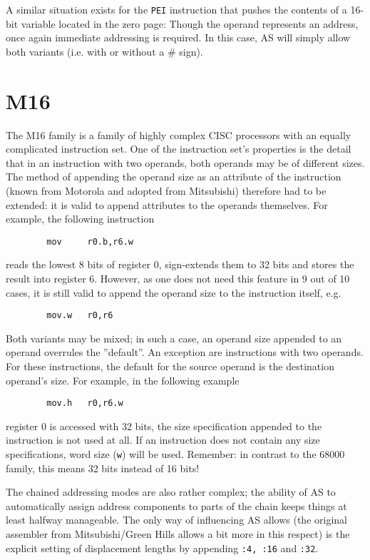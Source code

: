 \documentclass[12pt,twoside]{report}
\newcommand{\tty}[1]{{\tt #1}}
\newcommand{\asname}{{AS}}
\begin{document}
A similar situation exists for the \tty{PEI} instruction that pushes the
contents of a 16-bit variable located in the zero page: Though the operand
represents an address, once again immediate addressing is required.  In
this case, \asname{} will simply allow both variants (i.e. with or without a \#
sign).


\section{M16}

The M16 family is a family of highly complex CISC processors with an
equally complicated instruction set.  One of the instruction set's
properties is the detail that in an instruction with two operands,
both operands may be of different sizes.  The method of appending the
operand size as an attribute of the instruction (known from Motorola
and adopted from Mitsubishi) therefore had to be extended: it is
valid to append attributes to the operands themselves.  For example,
the following instruction
\begin{verbatim}
        mov     r0.b,r6.w
\end{verbatim}
reads the lowest 8 bits of register 0, sign-extends them to 32 bits
and stores the result into register 6.  However, as one does not need
this feature in 9 out of 10 cases, it is still valid to append the
operand size to the instruction itself, e.g.
\begin{verbatim}
        mov.w   r0,r6
\end{verbatim}
Both variants may be mixed; in such a case, an operand size appended
to an operand overrules the ''default''.  An exception are instructions
with two operands.  For these instructions, the default for the
source operand is the destination operand's size.  For example, in
the following example
\begin{verbatim}
        mov.h   r0,r6.w
\end{verbatim}
register 0 is accessed with 32 bits, the size specification appended
to the instruction is not used at all.  If an instruction does not
contain any size specifications, word size (\tty{w}) will be used.
Remember: in contrast to the 68000 family, this means 32 bits instead
of 16 bits!

The chained addressing modes are also rather complex; the ability of
\asname{} to automatically assign address components to parts of the chain
keeps things at least halfway manageable.  The only way of influencing
\asname{} allows (the original assembler from Mitsubishi/Green Hills allows
a bit more in this respect) is the explicit setting of displacement
lengths by appending \tty{:4, :16} and \tty{:32}.
\end{document}

